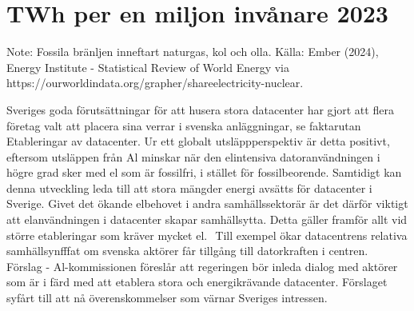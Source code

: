 {{{\section*{TWh per en miljon invånare 2023}

Note: Fossila bränljen inneftart naturgas, kol och olla.
Källa: Ember (2024), Energy Institute - Statistical Review of World Energy via https://ourworldindata.org/grapher/shareelectricity-nuclear.

Sveriges goda förutsättningar för att husera stora datacenter har gjort att flera företag valt att placera sina verrar i svenska anläggningar, se faktarutan Etableringar av datacenter. Ur ett globalt utsläppperspektiv är detta positivt, eftersom utsläppen från Al minskar när den elintensiva datoranvändningen i högre grad sker med el som är fossilfri, i stället för fossilbeorende. Samtidigt kan denna utveckling leda till att stora mängder energi avsätts för datacenter i Sverige. Givet det ökande elbehovet i andra samhällssektorär är det därför viktigt att elanvändningen i datacenter skapar samhällsytta. Detta gäller framför
allt vid större etableringar som kräver mycket el. \({ }^{}\) Till exempel ökar datacentrens relativa samhällsynfffat om svenska aktörer får tillgång till datorkraften i centren. \({ }^{}\)
Förslag
- Al-kommissionen föreslår att regeringen bör inleda dialog med aktörer som är i färd med att etablera stora och energikrävande datacenter. Förslaget syfårt till att nå överenskommelser som värnar Sveriges intressen.
}}}
